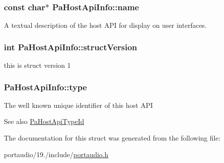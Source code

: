 \hypertarget{struct_pa_host_api_info_a78afe5d557543c82cd9773229e25a8ec}{
\subsubsection[{name}]{\setlength{\rightskip}{0pt plus 5cm}const char$\ast$ Pa\+Host\+Api\+Info\+::name}}\label{struct_pa_host_api_info_a78afe5d557543c82cd9773229e25a8ec}
A textual description of the host A\+P\+I for display on user interfaces. \hypertarget{struct_pa_host_api_info_a1f3a8c465488e7af8024237256d80c14}{
\subsubsection[{struct\+Version}]{\setlength{\rightskip}{0pt plus 5cm}int Pa\+Host\+Api\+Info\+::struct\+Version}}\label{struct_pa_host_api_info_a1f3a8c465488e7af8024237256d80c14}
this is struct version 1 \hypertarget{struct_pa_host_api_info_a5424bfcdf9f73b17cddc89e827a45d3f}{
\subsubsection[{type}]{ Pa\+Host\+Api\+Info\+::type}}\label{struct_pa_host_api_info_a5424bfcdf9f73b17cddc89e827a45d3f}
The well known unique identifier of this host A\+P\+I \begin{DoxySeeAlso}{See also}
\hyperlink{portaudio_8h_ae247ec252e84112170079ece319fc42c}{Pa\+Host\+Api\+Type\+Id} 
\end{DoxySeeAlso}


The documentation for this struct was generated from the following file\+:\begin{DoxyCompactItemize}
\item 
portaudio/19./include/\hyperlink{portaudio_8h}{portaudio.\+h}\end{DoxyCompactItemize}
